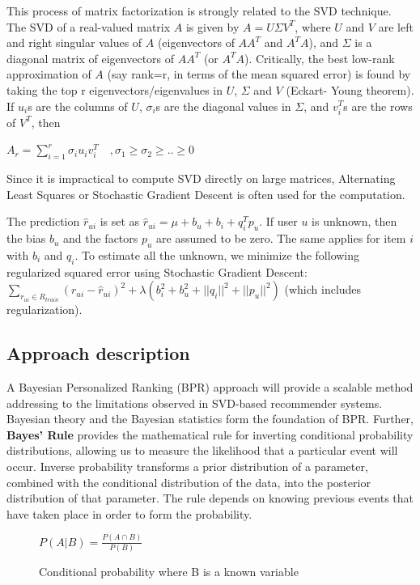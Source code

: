 \documentclass{article}
\begin{document}
This process of matrix factorization is strongly related to the SVD technique. The SVD of a real-valued matrix $A$ is given by $A=U \Sigma V^T$, where $U$ and $V$ are left and right singular values of $A$ (eigenvectors of $AA^T$ and $A^T A$), and $\Sigma$ is a diagonal matrix of eigenvectors of $AA^T$ (or $A^T A$). Critically, the best low-rank approximation of $A$ (say rank=r, in terms of the mean squared error) is found by taking the top r eigenvectors/eigenvalues in $U$, $\Sigma$ and $V$ (Eckart- Young theorem). If $u_i$s are the columns of $U$, $\sigma_i$s are the diagonal values in $\Sigma$, and $v_i^T$s are the rows of $V^T$, then

$A_r = \sum_{i=1}^{r} \sigma_i u_i v_i^T \quad , \sigma_1 \ge \sigma_2 \ge .. \ge 0$

Since it is impractical to compute SVD directly on large matrices, Alternating Least Squares \cite{als} or Stochastic Gradient Descent \cite{matfact} is often used for the computation.

The prediction $\hat{r}_{ui}$ is set as $\hat{r}_{ui} = \mu + b_u + b_i + q_i^Tp_u$.
If user $u$ is unknown, then the bias $b_u$ and the factors $p_u$ are assumed to be zero. The same applies for item $i$ with $b_i$ and $q_i$.
To estimate all the unknown, we minimize the following regularized squared error using Stochastic Gradient Descent:
$\sum_{r_{ui} \in R_{train}} (r_{ui} - \hat{r}_{ui})^2 + \lambda (b_i^2 + b_u^2 + ||q_i||^2 + ||p_u||^2)$ (which includes regularization).
\subsection{Approach description}

A Bayesian Personalized Ranking (BPR) approach will provide a scalable method addressing to the limitations observed in SVD-based recommender systems. Bayesian theory and the Bayesian statistics form the foundation of BPR. Further, \textbf{Bayes’ Rule} provides the mathematical rule for inverting conditional probability distributions, allowing us to measure the likelihood that a particular event will occur. Inverse probability transforms a prior distribution of a parameter, combined with the conditional distribution of the data, into the posterior distribution of that parameter\cite{SCHWEDER200115031}. The rule depends on knowing previous events that have taken place in order to form the probability.
\begin{figure}[ht]
    \centering
    $P(A|B)=\frac{P(A\cap B)}{P(B)}$
    \caption{Conditional probability where B is a known variable}
    \label{fig:conditional-prob}
\end{figure}
\end{document}
